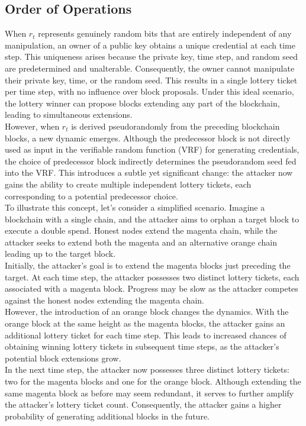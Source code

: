 \subsection{Order of Operations}
When $r_t$ represents genuinely random bits that are entirely independent of any manipulation, an owner of a public key obtains a unique credential at each time step. This uniqueness arises because the private key, time step, and random seed are predetermined and unalterable. Consequently, the owner cannot manipulate their private key, time, or the random seed. This results in a single lottery ticket per time step, with no influence over block proposals. Under this ideal scenario, the lottery winner can propose blocks extending any part of the blockchain, leading to simultaneous extensions.\\
However, when $r_t$ is derived pseudorandomly from the preceding blockchain blocks, a new dynamic emerges. Although the predecessor block is not directly used as input in the verifiable random function (VRF) for generating credentials, the choice of predecessor block indirectly determines the pseudorandom seed fed into the VRF. This introduces a subtle yet significant change: the attacker now gains the ability to create multiple independent lottery tickets, each corresponding to a potential predecessor choice.\\
To illustrate this concept, let's consider a simplified scenario. Imagine a blockchain with a single chain, and the attacker aims to orphan a target block to execute a double spend. Honest nodes extend the magenta chain, while the attacker seeks to extend both the magenta and an alternative orange chain leading up to the target block.\\
Initially, the attacker's goal is to extend the magenta blocks just preceding the target. At each time step, the attacker possesses two distinct lottery tickets, each associated with a magenta block. Progress may be slow as the attacker competes against the honest nodes extending the magenta chain.\\
However, the introduction of an orange block changes the dynamics. With the orange block at the same height as the magenta blocks, the attacker gains an additional lottery ticket for each time step. This leads to increased chances of obtaining winning lottery tickets in subsequent time steps, as the attacker's potential block extensions grow.\\
In the next time step, the attacker now possesses three distinct lottery tickets: two for the magenta blocks and one for the orange block. Although extending the same magenta block as before may seem redundant, it serves to further amplify the attacker's lottery ticket count. Consequently, the attacker gains a higher probability of generating additional blocks in the future.\\

